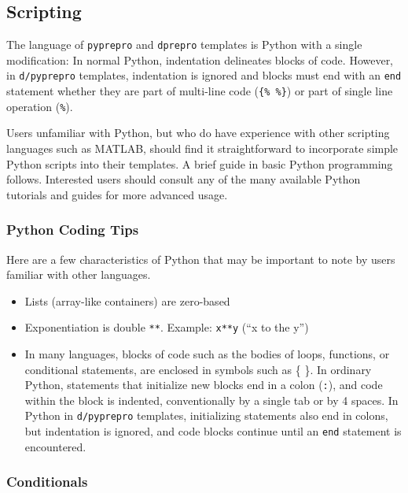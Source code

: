 {\subsection{Scripting}\label{interfaces:scripting}

The language of \texttt{pyprepro} and \texttt{dprepro} templates is 
Python with a single modification: In normal Python, indentation 
delineates blocks of code. However, in \texttt{d/pyprepro} templates, 
indentation is ignored and blocks must end with an \texttt{end} statement
whether they are part of multi-line code (\texttt{\{\%\ \%\}}) or part of 
single line operation (\texttt{\%}).

Users unfamiliar with Python, but who do have experience with
other scripting languages such as MATLAB, should find it straightforward
to incorporate simple Python scripts into their templates. A brief guide 
in basic Python programming follows. Interested users should consult any
of the many available Python tutorials and guides for more advanced usage.

\subsubsection{Python Coding Tips}\label{interfaces:python-coding-tips}

Here are a few characteristics of Python that may be important to note 
by users familiar with other languages.

\begin{itemize}
\tightlist
  \item Lists (array-like containers) are zero-based
  \item Exponentiation is double \texttt{**}. Example: \texttt{x**y} (``x to
  the y'')
  \item In many languages, blocks of code such as the bodies of loops, 
	  functions, or conditional statements, are enclosed in symbols such as 
	  \{ \}. In ordinary Python, statements that initialize new blocks end in
	  a colon (\texttt{:}), and code within the block is indented, conventionally
	  by a single tab or by 4 spaces. In Python in \texttt{d/pyprepro} templates, 
	  initializing statements also end in colons, but indentation is ignored, 
	  and code blocks continue until an \texttt{end} statement is encountered.
\end{itemize}

\subsubsection{Conditionals}\label{interfaces:conditionals}

}
